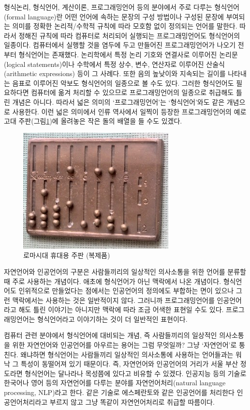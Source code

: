 \documentclass[b5paper,chapter,figtabcapt]{oblivoir}
\begin{document}
형식논리, 형식언어, 계산이론, 프로그래밍언어 등의 분야에서 주로 다루는
형식언어(formal language)란 어떤 언어에 속하는 문장의 구성 방법이나
구성된 문장에 부여되는 의미를 정확한 논리적/수학적 규칙에 따라 모호함 없이
정의되는 언어를 말한다. 따라서 정해진 규칙에 따라 컴퓨터로 처리되어 실행되는
프로그래밍언어도 형식언어의 일종이다. 컴퓨터에서 실행할 것을 염두에 두고
만들어진 프로그래밍언어가 나오기 전부터 형식언어는 존재했다.
논리학에서 특정 논리 기호와 연결사로 이루어진 논리문(logical statements)이나
수학에서 특정 상수, 변수, 연산자로 이루어진 산술식(arithmetic expressions)
등이 그 사례다. 또한 음의 높낮이와 지속되는 길이를 나타내는 음표로 이루어진
악보도 형식언어의 일종으로 볼 수도 있다. 그러한 형식언어도 필요하다면
컴퓨터에 옮겨 처리할 수 있으므로 프로그래밍언어의 일종으로 취급해도
틀린 개념은 아니다. 따라서 넓은 의미의 `프로그래밍언어'는 `형식언어'와도
같은 개념으로 사용한다. 이런 넓은 의미에서 인류 역사에서 일찍이 등장한
프로그래밍언어의 예로 고대 주판(그림\;\ref{fig:RomanAbacus})에 올려놓은
작은 돌의 배열을 들 수도 있겠다.

\begin{figure}[b]\center
\includegraphics[scale=0.5]{RomanAbacusRecon.jpg}
\caption{로마시대 휴대용 주판 (복제품)\label{fig:RomanAbacus}\\
          }
\end{figure}

자연언어와 인공언어의 구분은 사람들끼리의 일상적인 의사소통을 위한 언어를
분류할 때 주로 사용하는 개념이다. 애초에 형식언어가 아닌 맥락에서 나온 개념이다.
형식언어도 인위적으로 만들었다는 점에서는 인공언어의 정의에도 부합하는 면이 있으나
그런 맥락에서는 사용하는 것은 일반적이지 않다. 그러니까 프로그래밍언어를
인공언어라고 해도 틀린 이야기는 아니지만 맥락에 따라 조금 어색한 표현일 수도 있다.
프로그래밍언어는 형식언어라고 이야기하는 것이 더 일반적인 표현이다.

컴퓨터 관련 분야에서 형식언어에 대비되는 개념, 즉 사람들끼리의 일상적인
의사소통을 위한 자연언어와 인공언어를 아우르는 용어는 그럼 무엇일까?
그냥 `자연언어'로 퉁친다. 왜냐하면 형식언어는 사람들끼리 일상적인
의사소통에 사용하는 언어들과는 워낙 그 특성이 동떨어져 있기 때문이다.
즉, 자연언어와 인공언어의 거리가 서울 부산 정도라면 형식언어는 달나라나
목성쯤에 있다고 비유할 수 있겠다. 인공지능 등의 기술로 한국어나 영어 등의
자연언어를 다루는 분야를 자연언어처리(natural language processing, NLP)라고 한다.
같은 기술로 에스페란토와 같은 인공언어를 처리한다 인공언어처리라고 부르지 않고
그냥 똑같이 자연언어처리로 취급할 따름이다.
\end{document}
